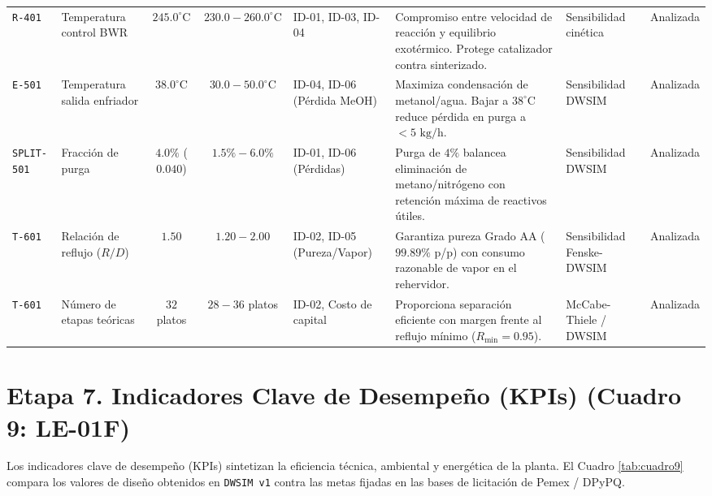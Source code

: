 \documentclass[10pt,letterpaper]{article}
\begin{document}
\begin{landscape}
\begin{xltabular}{\linewidth}{l >{\raggedright\arraybackslash}p{2.7cm} c c >{\raggedright\arraybackslash}p{2.3cm} >{\raggedright\arraybackslash}X >{\raggedright\arraybackslash}p{2.5cm} c}
\texttt{R-401} & Temperatura control BWR & $245.0^\circ\text{C}$ & $230.0 - 260.0^\circ\text{C}$ & ID-01, ID-03, ID-04 & Compromiso entre velocidad de reacción y equilibrio exotérmico. Protege catalizador contra sinterizado. & Sensibilidad cinética & Analizada \\
\texttt{E-501} & Temperatura salida enfriador & $38.0^\circ\text{C}$ & $30.0 - 50.0^\circ\text{C}$ & ID-04, ID-06 (Pérdida MeOH) & Maximiza condensación de metanol/agua. Bajar a $38^\circ\text{C}$ reduce pérdida en purga a $<5\text{ kg/h}$. & Sensibilidad DWSIM & Analizada \\
\texttt{SPLIT-501} & Fracción de purga & $4.0\%$ ($0.040$) & $1.5\% - 6.0\%$ & ID-01, ID-06 (Pérdidas) & Purga de $4\%$ balancea eliminación de metano/nitrógeno con retención máxima de reactivos útiles. & Sensibilidad DWSIM & Analizada \\
\texttt{T-601} & Relación de reflujo ($R/D$) & $1.50$ & $1.20 - 2.00$ & ID-02, ID-05 (Pureza/Vapor) & Garantiza pureza Grado AA ($99.89\%$ p/p) con consumo razonable de vapor en el rehervidor. & Sensibilidad Fenske-DWSIM & Analizada \\
\texttt{T-601} & Número de etapas teóricas & $32$ platos & $28 - 36$ platos & ID-02, Costo de capital & Proporciona separación eficiente con margen frente al reflujo mínimo ($R_{\text{min}} = 0.95$). & McCabe-Thiele / DWSIM & Analizada \\
\end{xltabular}
\end{landscape}

\newpage
\section{Etapa 7. Indicadores Clave de Desempeño (KPIs) (Cuadro 9: LE-01F)}

Los indicadores clave de desempeño (KPIs) sintetizan la eficiencia técnica, ambiental y energética de la planta. El Cuadro \ref{tab:cuadro9} compara los valores de diseño obtenidos en \texttt{DWSIM v1} contra las metas fijadas en las bases de licitación de Pemex / DPyPQ.
\end{document}
